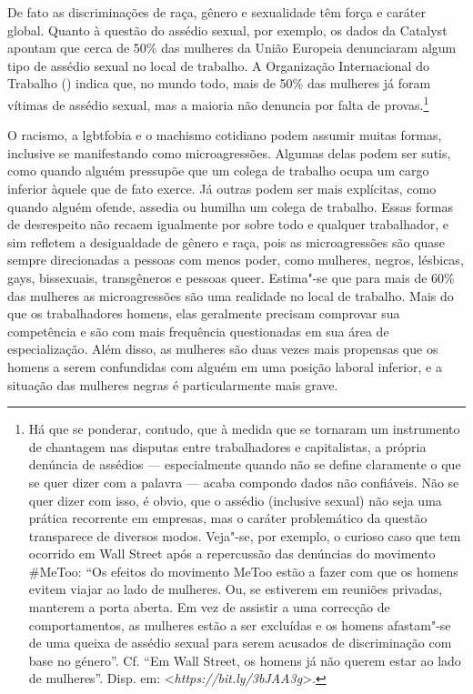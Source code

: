 De fato as discriminações de raça, gênero e sexualidade têm força e
caráter global. Quanto à questão do assédio sexual, por exemplo, os
dados da  Catalyst apontam que cerca de 50\% das mulheres da União
Europeia denunciaram algum tipo de assédio sexual no local de trabalho.
A Organização Internacional do Trabalho () indica que, no mundo todo,
mais de 50\% das mulheres já foram vítimas de assédio sexual, mas a
maioria não denuncia por falta de provas.\footnote{Há que se ponderar,
  contudo, que à medida que se tornaram um instrumento de chantagem nas
  disputas entre trabalhadores e capitalistas, a própria denúncia de
  assédios --- especialmente quando não se define claramente o que se
  quer dizer com a palavra --- acaba compondo dados não confiáveis. Não
  se quer dizer com isso, é obvio, que o assédio (inclusive sexual) não
  seja uma prática recorrente em empresas, mas o caráter problemático da
  questão transparece de diversos modos. Veja"-se, por exemplo, o curioso
  caso que tem ocorrido em Wall Street após a repercussão das denúncias
  do movimento \#MeToo: ``Os efeitos do movimento MeToo estão a fazer
  com que os homens evitem viajar ao lado de mulheres. Ou, se estiverem
  em reuniões privadas, manterem a porta aberta. Em vez de assistir a
  uma correcção de comportamentos, as mulheres estão a ser excluídas e
  os homens afastam"-se de uma queixa de assédio sexual para serem
  acusados de discriminação com base no género''. Cf. ``Em Wall Street,
  os homens já não querem estar ao lado de mulheres''. Disp. em:
  \textless{}\emph{https://bit.ly/3bJAA3g}\textgreater{}.}

O racismo, a lgbtfobia e o machismo cotidiano podem assumir muitas
formas, inclusive se manifestando como microagressões. Algumas delas
podem ser sutis, como quando alguém pressupõe que um colega de trabalho
ocupa um cargo inferior àquele que de fato exerce. Já outras podem ser
mais explícitas, como quando alguém ofende, assedia ou humilha um colega
de trabalho. Essas formas de desrespeito não recaem igualmente por sobre
todo e qualquer trabalhador, e sim refletem a desigualdade de gênero e
raça, pois as microagressões são quase sempre direcionadas a pessoas com
menos poder, como mulheres, negros, lésbicas, gays, bissexuais,
transgêneros e pessoas queer. Estima"-se que para mais de 60\% das
mulheres as microagressões são uma realidade no local de trabalho. Mais
do que os trabalhadores homens, elas geralmente precisam comprovar sua
competência e são com mais frequência questionadas em sua área de
especialização. Além disso, as mulheres são duas vezes mais propensas
que os homens a serem confundidas com alguém em uma posição laboral
inferior, e a situação das mulheres negras é particularmente mais grave.

